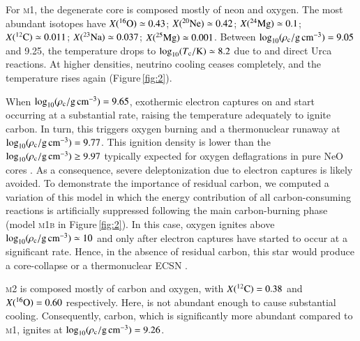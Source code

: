 \documentclass[twocolumn]{aa}
\begin{document}
For \textsc{m1}, the degenerate core is composed 
mostly of neon and oxygen. The most abundant isotopes have  $\abun{O}{16}\simeq 0.43$;  $\abun{Ne}{20}\simeq 0.42$; $\abun{Mg}{24}\simeq0.1$;  $\abun{C}{12}\simeq 0.011$; $\abun{Na}{23}\simeq 0.037$; $\abun{Mg}{25}\simeq 0.001$. Between $\logrhoc=9.05$ and 9.25, the temperature drops to $\logtc\simeq 8.2$ due to  and  direct Urca reactions. At higher densities, neutrino cooling ceases completely, and the temperature rises again (Figure\,\ref{fig:2}). 

When $\logrhoc=9.65$, exothermic electron captures on  and 
 start occurring at a substantial rate, raising the temperature 
adequately to ignite carbon. In turn, this triggers oxygen burning and a thermonuclear runaway at  $\logrhoc= 9.77$. This ignition density is  
lower than the   $\logrhoc\ge 9.97$ typically expected for oxygen deflagrations  in pure NeO cores \citep{Jones:2018ule}. As a consequence, 
severe deleptonization due to  electron captures is likely avoided.  To demonstrate the importance of residual carbon, we 
computed a variation of this model in which the energy contribution of all carbon-consuming reactions is artificially suppressed following the 
main carbon-burning phase (model \textsc{m1b} in Figure\,\ref{fig:2}). In this case, oxygen ignites above $\logrhoc\simeq 10$ and only after  electron captures have started to occur at a significant rate. Hence, in the absence of residual carbon, this star would produce a core-collapse or a thermonuclear ECSN \citep{Jones:2016asr}.

\textsc{m2} is composed mostly of carbon and oxygen, with $\abun{C}{12}=0.38$ and $\abun{O}{16}=0.60$ respectively. 
 Here,  is not abundant enough to cause  substantial cooling. Consequently, carbon, which is significantly more abundant compared to \textsc{m1}, ignites at $\logrhoc=9.26$. 
 
\end{document}
